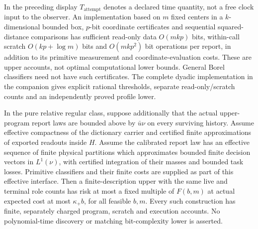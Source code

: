 In the preceding display $T_{\mathrm{attempt}}$ denotes a declared time quantity, not a free clock input to the observer. An implementation based on $m$ fixed centers in a $k$-dimensional bounded box, $p$-bit coordinate certificates and sequential squared-distance comparisons has sufficient read-only data $O(mkp)$ bits, within-call scratch $O(kp+\log m)$ bits and $O(mkp^2)$ bit operations per report, in addition to its primitive measurement and coordinate-evaluation costs. These are upper accounts, not optimal computational lower bounds. General Borel classifiers need not have such certificates. The complete dyadic implementation in the companion gives explicit rational thresholds, separate read-only/scratch counts and an independently proved profile lower.


\begin{corollary}\label{cor:effective}
In the pure relative regular class, suppose additionally that the actual upper-program report laws are bounded above by $\bar u\nu$ on every surviving history. Assume effective compactness of the dictionary carrier and certified finite approximations of exported readouts inside $H$. Assume the calibrated report law has an effective sequence of finite physical partitions which approximates bounded finite decision vectors in $L^1(\nu)$, with certified integration of their masses and bounded task losses. Primitive classifiers and their finite costs are supplied as part of this effective interface. Then a finite-description upper with the same live and terminal role counts has risk at most a fixed multiple of $F(b,m)$ at actual expected cost at most $\kappa_+b$, for all feasible $b,m$. Every such construction has finite, separately charged program, scratch and execution accounts. No polynomial-time discovery or matching bit-complexity lower is asserted.
\end{corollary}
